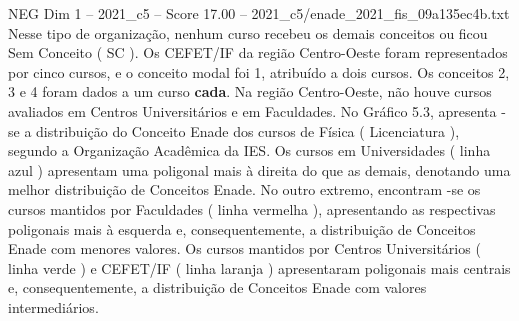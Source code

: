 \begin{textsample}{NEG Dim 1 – 2021\_c5 – Score 17.00 – 2021\_c5/enade\_2021\_fis\_09a135ec4b.txt}
Nesse tipo de organização, nenhum curso recebeu os demais conceitos ou ficou Sem Conceito ( SC ).
Os CEFET/IF da região Centro-Oeste foram representados por cinco cursos, e o conceito modal foi 1, atribuído a dois cursos.
Os conceitos 2, 3 e 4 foram dados a um curso \textbf{cada}.
Na região Centro-Oeste, não houve cursos avaliados em Centros Universitários e em Faculdades.
No Gráfico 5.3, apresenta -se a distribuição do Conceito Enade dos cursos de Física ( Licenciatura ), segundo a Organização Acadêmica da IES.
Os cursos em Universidades ( linha azul ) apresentam uma poligonal mais à direita do que as demais, denotando uma melhor distribuição de Conceitos Enade.
No outro extremo, encontram -se os cursos mantidos por Faculdades ( linha vermelha ), apresentando as respectivas poligonais mais à esquerda e, consequentemente, a distribuição de Conceitos Enade com menores valores.
Os cursos mantidos por Centros Universitários ( linha verde ) e CEFET/IF ( linha laranja ) apresentaram poligonais mais centrais e, consequentemente, a distribuição de Conceitos Enade com valores intermediários.

\end{textsample}
